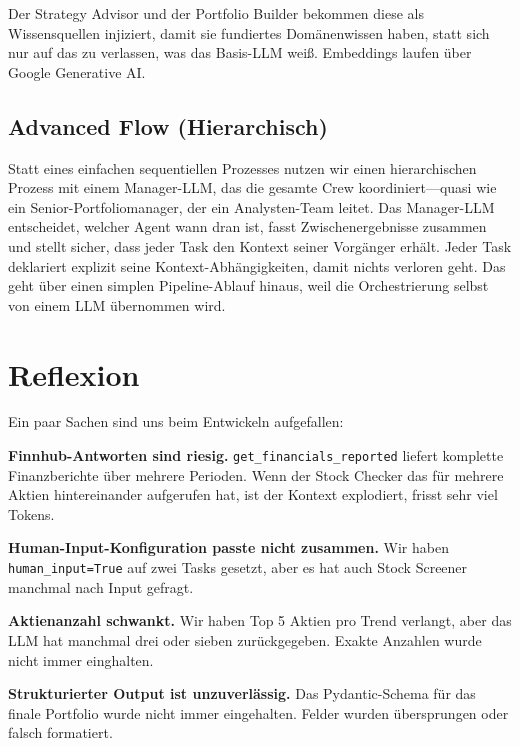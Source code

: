 \documentclass[conference]{IEEEtran}
\begin{document}
Der Strategy Advisor und der Portfolio Builder bekommen diese als
Wissensquellen injiziert, damit sie fundiertes Domänenwissen haben,
statt sich nur auf das zu verlassen, was das Basis-LLM weiß.
Embeddings laufen über Google Generative AI.

\subsection{Advanced Flow (Hierarchisch)}

Statt eines einfachen sequentiellen Prozesses nutzen wir einen
hierarchischen Prozess mit einem Manager-LLM, das die gesamte Crew
koordiniert---quasi wie ein Senior-Portfoliomanager, der ein
Analysten-Team leitet. Das Manager-LLM entscheidet, welcher Agent
wann dran ist, fasst Zwischenergebnisse zusammen und stellt sicher,
dass jeder Task den Kontext seiner Vorgänger erhält. Jeder Task
deklariert explizit seine Kontext-Abhängigkeiten, damit nichts
verloren geht. Das geht über einen simplen Pipeline-Ablauf hinaus,
weil die Orchestrierung selbst von einem LLM übernommen wird.

\section{Reflexion}

Ein paar Sachen sind uns beim Entwickeln aufgefallen:

\textbf{Finnhub-Antworten sind riesig.}
\texttt{get\_financials\_reported} liefert komplette Finanzberichte
über mehrere Perioden. Wenn der Stock Checker das für mehrere Aktien
hintereinander aufgerufen hat, ist der Kontext explodiert, frisst sehr viel Tokens.

\textbf{Human-Input-Konfiguration passte nicht zusammen.}
Wir haben \texttt{human\_input=True} auf zwei Tasks gesetzt, aber es hat auch Stock Screener manchmal nach Input gefragt.

\textbf{Aktienanzahl schwankt.}
Wir haben Top 5 Aktien pro Trend verlangt, aber das LLM hat
manchmal drei oder sieben zurückgegeben. Exakte Anzahlen wurde nicht immer einghalten.

\textbf{Strukturierter Output ist unzuverlässig.}
Das Pydantic-Schema für das finale Portfolio wurde nicht immer
eingehalten. Felder wurden übersprungen oder falsch formatiert.
\end{document}
